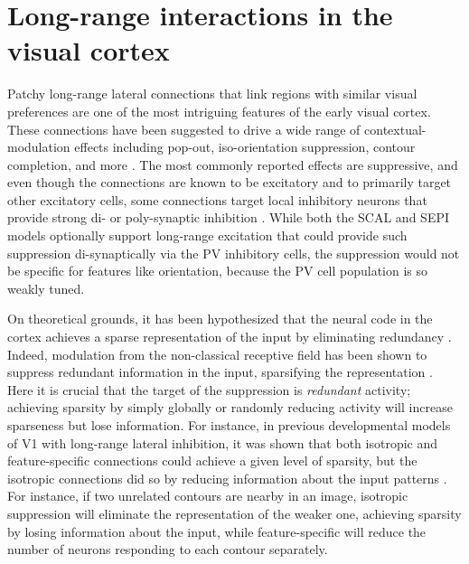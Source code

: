 \chapter{Long-range interactions in the visual cortex}

Patchy long-range lateral connections that link regions with similar
visual preferences are one of the most intriguing features of the
early visual cortex. These connections have been suggested to drive a
wide range of contextual-modulation effects including pop-out,
iso-orientation suppression, contour completion, and more
\citep{Gilbert1983, Hirsch1991, McGuire1991, Grinvald1994,
  Fitzpatrick2000, Hupe2001, Stettler2002}.  The most commonly
reported effects are suppressive, and even though the connections are
known to be excitatory and to primarily target other excitatory cells,
some connections target local inhibitory neurons that provide strong
di- or poly-synaptic inhibition \citep{Hirsch1991,Weliky1995}.  While
both the SCAL and SEPI models optionally support long-range excitation
that could provide such suppression di-synaptically via the PV
inhibitory cells, the suppression would not be specific for features
like orientation, because the PV cell population is so weakly tuned.

On theoretical grounds, it has been hypothesized that the neural code
in the cortex achieves a sparse representation of the input by
eliminating redundancy \citep{barlow:comneuron89,Olshausen1996}.
Indeed, modulation from the non-classical receptive field has been
shown to suppress redundant information in the input, sparsifying the
representation \citep{Vinje2000}. Here it is crucial that the target
of the suppression is \emph{redundant} activity; achieving sparsity by
simply globally or randomly reducing activity will increase sparseness
but lose information.  For instance, in previous developmental models
of V1 with long-range lateral inhibition, it was shown that both
isotropic and feature-specific connections could achieve a given level
of sparsity, but the isotropic connections did so by reducing
information about the input patterns \citep{Miikkulainen2005}.  For
instance, if two unrelated contours are nearby in an image, isotropic
suppression will eliminate the representation of the weaker one,
achieving sparsity by losing information about the input, while
feature-specific will reduce the number of neurons responding to each
contour separately.

